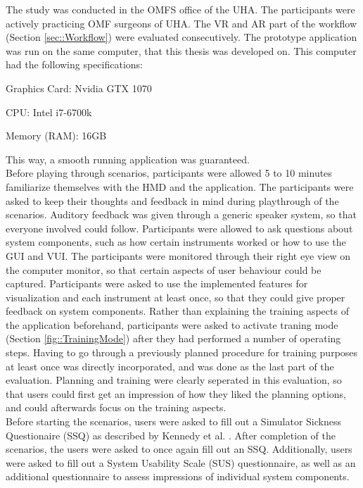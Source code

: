 The study was conducted in the OMFS office of the UHA.
The participants were actively practicing OMF surgeons of UHA.
The VR and AR part of the workflow (Section \ref{sec::Workflow}) were evaluated consecutively.
The prototype application was run on the same computer, that this 
thesis was developed on.
This computer had the following specifications:

\begin{compactenum}[label=(\alph*)]
    \item Graphics Card: Nvidia GTX 1070
    \item CPU: Intel i7-6700k
    \item Memory (RAM): 16GB
\end{compactenum}

This way, a smooth running application was guaranteed.
\\ Before playing through scenarios, participants were allowed 5 to 10 minutes familiarize themselves with the HMD and the application.
The participants were asked to keep their thoughts and feedback in mind during playthrough of the scenarios.
Auditory feedback was given through a generic speaker system, so that everyone involved could follow.
Participants were allowed to ask questions about system components, such as how certain instruments worked or how to use the GUI and VUI.
The participants were monitored through their right eye view on the computer monitor, so that certain aspects of user behaviour could be captured.
Participants were asked to use the implemented features for visualization and each instrument at least once, so that they could give proper feedback on system components.
Rather than explaining the training aspects of the application beforehand, participants were asked to activate traning mode (Section \ref{fig::TrainingMode}) after they had performed a number 
of operating steps.
Having to go through a previously planned procedure for training purposes at least once was directly incorporated, and was done as the last part of the evaluation.
Planning and training were clearly seperated in this evaluation, so that users could first get an impression of how they liked the planning options, and could afterwards focus on the training aspects.
\\ Before starting the scenarios, users were asked to fill out a Simulator Sickness Questionaire (SSQ) as described by Kennedy et al. \cite{kennedy1993simulator}.
After completion of the scenarios, the users were asked to once again fill out an SSQ.
Additionally, users were asked to fill out a System Usability Scale (SUS) \cite{brooke1996sus} questionnaire, as well as an additional questionnaire to assess impressions of individual system components.
